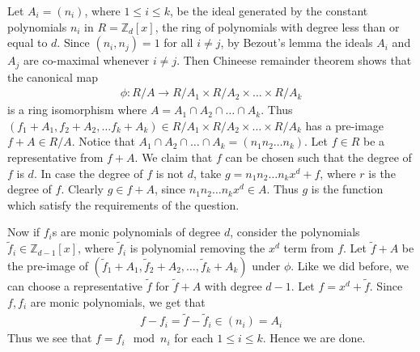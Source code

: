 \documentclass[12pt]{exam}
\theoremstyle{plain} %
\theoremstyle{definition} %
\theoremstyle{remark} %
\begin{document}
\begin{questions}
  \question
  \begin{solution}
    Let $A_i = (n_i)$, where $1 \le i \le k$,  be the ideal generated
    by the constant polynomials $n_i$ in $R = \mathbb{Z}_d[x]$, the
    ring of polynomials with degree less than or equal to $d$.
    Since $(n_i, n_j) = 1$ for all $i \neq j$, by Bezout's lemma the
    ideals $A_i$ and $A_j$ are co-maximal whenever $i \neq j$.
    Then Chineese remainder theorem shows that the canonical map
    \begin{align*}
      \phi: R/A \to R/A_1 \times
      R/A_2 \times \ldots \times R/A_k
    \end{align*}
    is a ring isomorphism where $A = A_1 \cap A_2 \cap \ldots \cap
    A_k$. Thus $(f_1+A_1 , f_2+A_2 ,\ldots f_k + A_k) \in  R/A_1 \times
    R/A_2 \times \ldots \times R/A_k$ has a pre-image $f + A \in
    R/A$. Notice that $A_1 \cap A_2 \cap \ldots \cap A_k = (n_1n_2
    \ldots n_k)$. Let $f \in R$ be a representative from $f + A$. We
    claim that $f$ can be chosen such that the degree of $f$ is $d$.
    In case the degree of $f$ is not $d$, take $g = n_1n_2 \ldots n_k
    x^{d} + f$, where $r$ is the degree of $f$. Clearly $g \in f +
    A$, since $n_1n_2 \ldots n_k x^{d} \in A$. Thus $g$ is the
    function which satisfy the requirements of the question.

    Now if $f_i$s are monic polynomials of degree $d$, consider the
    polynomials $\tilde{f}_i \in \mathbb{Z}_{d-1}[x]$, where
    $\tilde{f}_i$ is polynomial
    removing the $x^d$ term from $f$. Let $\tilde{f} + A$ be
    the pre-image of $(\tilde{ f}_1 + A_1, \tilde{f}_2 + A_2, \ldots,
    \tilde{f}_k + A_k)$ under $\phi$. Like we did before, we can
    choose a representative $\tilde{f}$ for $\tilde{f} + A$ with
    degree $d-1$. Let $f = x^d + \tilde{f}$. Since $f, f_i$ are monic
    polynomials, we get that
    \begin{align*}
      f - f_i = \tilde{f} - \tilde{f}_i \in (n_i) = A_i
    \end{align*}
    Thus we see that $f = f_i \mod n_i$ for each $1 \le i \le k$.
    Hence we are done.
  \end{solution}


\end{questions}
\end{document}
